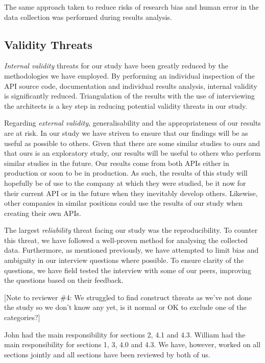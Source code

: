 \documentclass[10pt,twocolumn]{article}
\begin{document}
The same approach taken to reduce risks of research bias and human error in the data collection was performed during results analysis. 


\subsection{Validity Threats}

\textit{Internal validity} threats for our study have been greatly reduced by the methodologies we have employed. By performing an individual inspection of  the API source code, documentation and individual results analysis, internal validity is significantly reduced. Triangulation of the results with the use of interviewing the architects is a key step in reducing potential validity threats in our study.

Regarding \textit{external validity}, generalisability and the appropriateness of our results are at risk. In our study we have striven to ensure that our findings will be as useful as possible to others. Given that there are some similar studies to ours and that ours is an exploratory study, our results will be useful to others who perform similar studies in the future. Our results come from both APIs either in production or soon to be in production. As such, the results of this study will hopefully be of use to the company at which they were studied, be it now for their current API or in the future when they inevitably develop others. Likewise, other companies in similar positions could use the results of our study when creating their own APIs.

The largest \textit{reliability} threat facing our study was the reproducibility. To counter this threat, we have followed a well-proven method for analysing the collected data. Furthermore, as mentioned previously, we have attempted to limit bias and ambiguity in our interview questions where possible. To ensure clarity of the questions, we have field tested the interview with some of our peers, improving the questions based on their feedback.

[Note to reviewer \#4: We struggled to find construct threats as we've not done the study so we don't know any yet, is it normal or OK to exclude one of the categories?]





John had the main responsibility for sections 2, 4.1 and 4.3. William had the main responsibility for sections 1, 3, 4.0 and 4.3. We have, however, worked on all sections jointly and all sections have been reviewed by both of us. 
\end{document}
